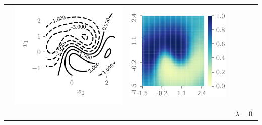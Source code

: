 \documentclass{article}
\theoremstyle{definition}
\newcommand{\mcl}[1]{\mathcal{#1}}
\newcommand{\mbb}[1]{\mathbb{#1}}
\newcommand{\da}{\mcl{D}}
\newcommand{\dc}{\mcl{D}_r}
\newcommand{\dr}{\mcl{D}_e}
\begin{document}
\begin{table}
\begin{tabular}{@{}c@{}c@{}c@{}c@{}c@{}c@{}c@{}}
&
\includegraphics[trim={7mm 8mm 3mm 3mm}, clip,height=0.13\textwidth]{img/moon/moon_rm_50_elbo_meanf_0_0.pdf}
&
\includegraphics[height=0.13\textwidth]{img/moon/moon_rm_50_elbo_prob_0_0.pdf}
\\
& & & 
\multicolumn{4}{c}{$\lambda = 0$}\\
\bottomrule
\end{tabular}
\label{tbl:moon4casemean}
\end{table}
%
\end{document}

